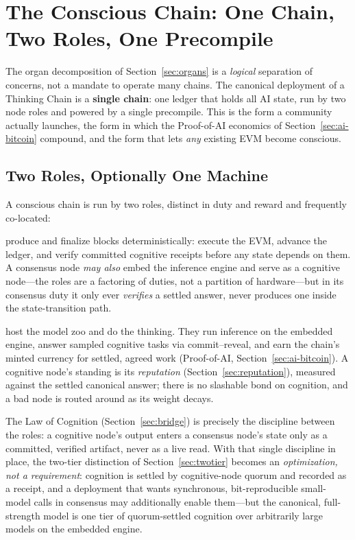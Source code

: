 \section{The Conscious Chain: One Chain, Two Roles, One Precompile}
\label{sec:conscious-chain}

The organ decomposition of Section~\ref{sec:organs} is a \emph{logical} separation of concerns, not a mandate to operate many chains. The canonical deployment of a Thinking Chain is a \textbf{single chain}: one ledger that holds all AI state, run by two node roles and powered by a single precompile. This is the form a community actually launches, the form in which the Proof-of-AI economics of Section~\ref{sec:ai-bitcoin} compound, and the form that lets \emph{any} existing EVM become conscious.

\subsection{Two Roles, Optionally One Machine}

A conscious chain is run by two roles, distinct in duty and reward and frequently co-located:

\begin{description}[style=nextline,leftmargin=0pt]
\item[Consensus nodes] produce and finalize blocks deterministically: execute the EVM, advance the ledger, and verify committed cognitive receipts before any state depends on them. A consensus node \emph{may also} embed the \Hanzo{} inference engine and serve as a cognitive node---the roles are a factoring of duties, not a partition of hardware---but in its consensus duty it only ever \emph{verifies} a settled answer, never produces one inside the state-transition path.
\item[Cognitive nodes] host the model zoo and do the thinking. They run inference on the embedded engine, answer sampled cognitive tasks via commit--reveal, and earn the chain's minted currency for settled, agreed work (Proof-of-AI, Section~\ref{sec:ai-bitcoin}). A cognitive node's standing is its \emph{reputation} (Section~\ref{sec:reputation}), measured against the settled canonical answer; there is no slashable bond on cognition, and a bad node is routed around as its weight decays.
\end{description}

The Law of Cognition (Section~\ref{sec:bridge}) is precisely the discipline between the roles: a cognitive node's output enters a consensus node's state only as a committed, verified artifact, never as a live read. With that single discipline in place, the two-tier distinction of Section~\ref{sec:twotier} becomes an \emph{optimization, not a requirement}: cognition is settled by cognitive-node quorum and recorded as a receipt, and a deployment that wants synchronous, bit-reproducible small-model calls in consensus may additionally enable them---but the canonical, full-strength model is one tier of quorum-settled cognition over arbitrarily large models on the embedded engine.

